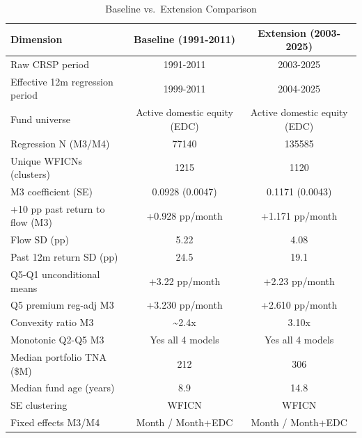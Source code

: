 \begin{table}[htbp]
\centering
\caption{Baseline vs.\ Extension Comparison}
\label{tab:comparison}
\small
\begin{tabular}{lcc}
\toprule
Dimension & Baseline (1991-2011) & Extension (2003-2025) \\
\midrule
Raw CRSP period & 1991-2011 & 2003-2025 \\
Effective 12m regression period & 1999-2011 & 2004-2025 \\
Fund universe & Active domestic equity (EDC) & Active domestic equity (EDC) \\
Regression N (M3/M4) & 77140 & 135585 \\
Unique WFICNs (clusters) & 1215 & 1120 \\
M3 coefficient (SE) & 0.0928 (0.0047) & 0.1171 (0.0043) \\
+10 pp past return to flow (M3) & +0.928 pp/month & +1.171 pp/month \\
Flow SD (pp) & 5.22 & 4.08 \\
Past 12m return SD (pp) & 24.5 & 19.1 \\
Q5-Q1 unconditional means & +3.22 pp/month & +2.23 pp/month \\
Q5 premium reg-adj M3 & +3.230 pp/month & +2.610 pp/month \\
Convexity ratio M3 & \textasciitilde 2.4x & 3.10x \\
Monotonic Q2-Q5 M3 & Yes all 4 models & Yes all 4 models \\
Median portfolio TNA (\$M) & 212 & 306 \\
Median fund age (years) & 8.9 & 14.8 \\
SE clustering & WFICN & WFICN \\
Fixed effects M3/M4 & Month / Month+EDC & Month / Month+EDC \\
\bottomrule
\end{tabular}
\end{table}
